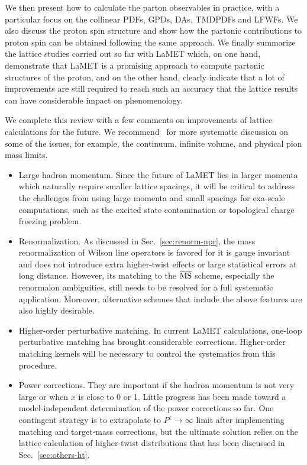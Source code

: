 \documentclass[aps,rmp,reprint,amsmath,amssymb,graphicx,longbibliography]{revtex4-1} %
\newcommand{\MS}{{\overline{\rm MS}}}
\DeclareRobustCommand{\sec}[1]{Sec.~\ref{sec:#1}}
\begin{document}
We then present how to calculate the parton observables in practice, with a particular focus on the collinear PDFs, GPDs, DAs, TMDPDFs and LFWFs. We also discuss the proton spin structure and show how the partonic contributions to proton spin can be obtained following the same approach. We finally summarize the lattice studies carried out so far with LaMET which, on one hand, demonstrate that LaMET is a promising approach to compute partonic structures of the proton, and on the other hand, clearly indicate that a lot of improvements are still required to reach such an accuracy that the lattice results can have considerable impact on phenomenology.

We complete this review with a few comments on improvements of lattice calculations for the future.
%
We recommend~\cite{Alexandrou:2019lfo} for more systematic discussion on some of the issues, for example, the continuum, infinite volume, and physical pion mass limits.

\begin{itemize}
	
	\item Large hadron momentum. Since the future of LaMET lies in larger momenta which naturally require smaller lattice spacings, it will be critical to address the challenges from using large momenta and small spacings for exa-scale computations, such as the excited state contamination or topological charge freezing problem.
	
	\item Renormalization. As discussed in \sec{renorm-npr}, the mass renormalization of Wilson line operators is favored for it is gauge invariant and does not introduce extra higher-twist effects or large statistical errors at long distance. However, its matching to the $\MS$ scheme, especially the renormalon ambiguities, still needs to be resolved for a full systematic application. Moreover, alternative schemes that include the above features are also highly desirable.
	
	\item Higher-order perturbative matching. In current LaMET calculations, one-loop perturbative matching
	has brought considerable corrections. Higher-order matching kernels will be necessary to control the systematics from this procedure.
	
	\item Power corrections. They are important if the hadron momentum is not very large or when $x$ is close to 0 or 1.
	Little progress has been made toward a model-independent determination of the power corrections so far. One contingent strategy is to extrapolate to $P^z\to\infty$ limit after implementing matching and target-mass corrections, but the ultimate solution relies on the lattice calculation of higher-twist distributions that has been discussed in \sec{others-ht}.
	
\end{itemize}
\end{document}
